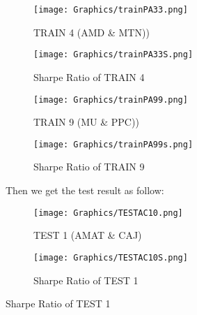 \newpage
\begin{figure}[H]
\begin{subfigure}{.5\textwidth}%
\centering
\texttt{[image: Graphics/trainPA33.png]} \caption{TRAIN 4 (AMD \& MTN))} 
\end{subfigure}%
\begin{subfigure}{.5\textwidth}%
\centering
\texttt{[image: Graphics/trainPA33S.png]} \caption{Sharpe Ratio of TRAIN 4}
\end{subfigure}%
\vspace{0.1cm}
\begin{subfigure}{.5\textwidth}%
\centering
\texttt{[image: Graphics/trainPA99.png]} \caption{TRAIN 9 (MU \& PPC))} 
\end{subfigure}%
\begin{subfigure}{.5\textwidth}%
\centering
\texttt{[image: Graphics/trainPA99s.png]} \caption{Sharpe Ratio of TRAIN 9}
\end{subfigure}%
\vspace{0.7cm}

Then we get the test result as follow:

\vspace{0.4cm}
\begin{subfigure}{.5\textwidth}%
\centering
\texttt{[image: Graphics/TESTAC10.png]} \caption{TEST 1 (AMAT \& CAJ)} 
\end{subfigure}%
\begin{subfigure}{.5\textwidth}%
\centering
\texttt{[image: Graphics/TESTAC10S.png]} \caption{Sharpe Ratio of TEST 1}
\end{subfigure}%
\end{figure}

